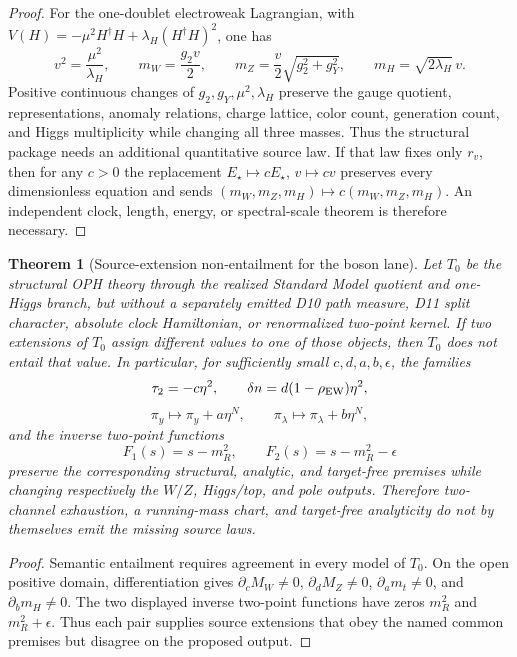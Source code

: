 \documentclass[11pt]{article}
\newtheorem{theorem}{Theorem}[section]
\begin{document}
\begin{proof}
For the one-doublet electroweak Lagrangian, with
\(V(H)=-\mu^2H^\dagger H+\lambda_H(H^\dagger H)^2\), one has
\[
v^2=\frac{\mu^2}{\lambda_H},\qquad
m_W=\frac{g_2v}{2},\qquad
m_Z=\frac v2\sqrt{g_2^2+g_Y^2},\qquad
m_H=\sqrt{2\lambda_H}\,v.
\]
Positive continuous changes of \(g_2,g_Y,\mu^2,\lambda_H\) preserve the
gauge quotient, representations, anomaly relations, charge lattice, color
count, generation count, and Higgs multiplicity while changing all three
masses.  Thus the structural package needs an additional quantitative source
law.  If that law fixes only \(r_v\), then for any \(c>0\) the replacement
\(E_\star\mapsto cE_\star\), \(v\mapsto cv\) preserves every dimensionless
equation and sends \((m_W,m_Z,m_H)\mapsto c(m_W,m_Z,m_H)\).  An independent
clock, length, energy, or spectral-scale theorem is therefore necessary.
\end{proof}

\begin{theorem}[Source-extension non-entailment for the boson
lane]\label{thm:boson-source-extension-no-go}
Let $T_0$ be the structural OPH theory through the realized Standard Model
quotient and one-Higgs branch, but without a separately emitted D10 path
measure, D11 split character, absolute clock Hamiltonian, or renormalized
two-point kernel. If two extensions of $T_0$ assign different values to one
of those objects, then $T_0$ does not entail that value. In particular, for
sufficiently small $c,d,a,b,\epsilon$, the families
\[
 \tau_2=-c\eta^2,\qquad
 \delta n=d(1-\rho_{\rm EW})\eta^2,
\]
\[
 \pi_y\mapsto\pi_y+a\eta^N,\qquad
 \pi_\lambda\mapsto\pi_\lambda+b\eta^N,
\]
and the inverse two-point functions
\[
 F_1(s)=s-m_R^2,\qquad F_2(s)=s-m_R^2-\epsilon
\]
preserve the corresponding structural, analytic, and target-free premises
while changing respectively the $W/Z$, Higgs/top, and pole outputs.
Therefore two-channel exhaustion, a running-mass chart, and target-free
analyticity do not by themselves emit the missing source laws.
\end{theorem}

\begin{proof}
Semantic entailment requires agreement in every model of $T_0$. On the open
positive domain, differentiation gives
\(\partial_c M_W\ne0\), \(\partial_d M_Z\ne0\),
\(\partial_a m_t\ne0\), and \(\partial_b m_H\ne0\). The two displayed inverse
two-point functions have zeros $m_R^2$ and $m_R^2+\epsilon$. Thus each pair
supplies source extensions that obey the named common premises but disagree on
the proposed output.
\end{proof}
\end{document}
